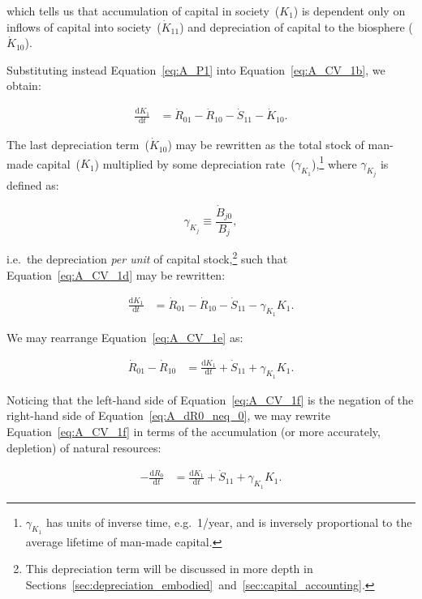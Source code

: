 \noindent{}which tells us that 
accumulation of capital in society~($K_{1}$)
is dependent only on 
inflows of capital into society~($\dot{K}_{11}$) 
and depreciation of capital 
to the biosphere ($\dot{K}_{10}$).

Substituting instead Equation~\ref{eq:A_P1} 
into Equation~\ref{eq:A_CV_1b}, we obtain:

 \begin{align}\label{eq:A_CV_1d}
	\frac{\mathrm{d}K_{1}}{\mathrm{d}t}		&
	= \dot{R}_{01} 
	- \dot{R}_{10}
	- \dot{S}_{11}
	- \dot{K}_{10}.
\end{align}

The last depreciation term~($\dot{K}_{10}$)
may be rewritten as the total stock
of man-made capital~($K_{1}$) 
multiplied by some depreciation rate~($\gamma_{K_{1}}$),\footnote{$\gamma_{K_{1}}$
	has units of inverse time, e.g.\ 1/year,
	and is inversely proportional to the average lifetime
	of man-made capital.}
where $\gamma_{K_{j}}$ is defined as:

\begin{equation}\label{eq:def_gamma}
\gamma_{K_{j}} \equiv \frac{\dot{B}_{j0}}{B_{j}},
\end{equation}

\noindent{}i.e.\ the depreciation 
\emph{per unit} of capital stock,\footnote{This
	depreciation term will be discussed in more depth in
	Sections~\ref{sec:depreciation_embodied}~and~\ref{sec:capital_accounting}.
	}
such that Equation~\ref{eq:A_CV_1d} may be rewritten:

 \begin{align}\label{eq:A_CV_1e}
	\frac{\mathrm{d}K_{1}}{\mathrm{d}t}		&
	= \dot{R}_{01} 
	- \dot{R}_{10}
	- \dot{S}_{11}
	- \gamma_{K_{1}}{K}_{1}.
\end{align}

We may rearrange Equation~\ref{eq:A_CV_1e} as:

 \begin{align}\label{eq:A_CV_1f}
	\dot{R}_{01} 
	- \dot{R}_{10}												&
	= 	\frac{\mathrm{d}K_{1}}{\mathrm{d}t}
	+ \dot{S}_{11}
	+ \gamma_{K_{1}}{K}_{1}.
\end{align}

Noticing that the left-hand side
of Equation~\ref{eq:A_CV_1f} is the negation 
of the right-hand side of Equation~\ref{eq:A_dR0_neq_0},
we may rewrite Equation~\ref{eq:A_CV_1f}
in terms of the accumulation
(or more accurately, depletion)
of natural resources: 

 \begin{align}\label{eq:A_CV_1g}
	- 	\frac{\mathrm{d}R_{0}}{\mathrm{d}t}	&
	= 	\frac{\mathrm{d}K_{1}}{\mathrm{d}t}
	+ \dot{S}_{11}
	+ \gamma_{K_{1}}{K}_{1}.
\end{align}


